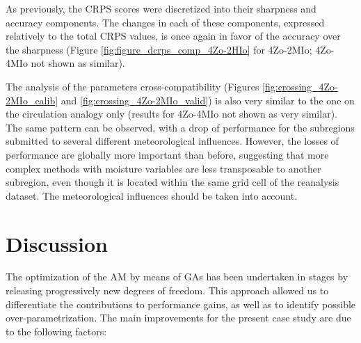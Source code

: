 \documentclass[5p]{elsarticle}
\begin{document}
As previously, the CRPS scores were discretized into their sharpness and accuracy components. The changes in each of these components, expressed relatively to the total CRPS values, is once again in favor of the accuracy over the sharpness (Figure \ref{fig:figure_dcrps_comp_4Zo-2HIo} for 4Zo-2MIo; 4Zo-4MIo not shown as similar).

The analysis of the parameters cross-compatibility (Figures \ref{fig:crossing_4Zo-2MIo_calib} and \ref{fig:crossing_4Zo-2MIo_valid}) is also very similar to the one on the circulation analogy only (results for 4Zo-4MIo not shown as very similar). The same pattern can be observed, with a drop of performance for the subregions submitted to several different meteorological influences. However, the losses of performance are globally more important than before, suggesting that more complex methods with moisture variables are less transposable to another subregion, even though it is located within the same grid cell of the reanalysis dataset. The meteorological influences should be taken into account.


\section{Discussion}
\label{sec:discussion}

The optimization of the AM by means of GAs has been undertaken in stages by releasing progressively new degrees of freedom. This approach allowed us to differentiate the contributions to performance gains, as well as to identify possible over-parametrization. The main improvements for the present case study are due to the following factors:
\end{document}
